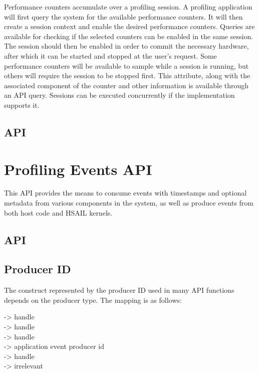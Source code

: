 \documentclass[oneside]{book}
\begin{document}
Performance counters accumulate over a profiling session. A profiling application will first query the system for the available performance counters. It will then create a session context and enable the desired performance counters. Queries are available for checking if the selected counters can be enabled in the same session. The session should then be enabled in order to commit the necessary hardware, after which it can be started and stopped at the user's request. Some performance counters will be available to sample while a session is running, but others will require the session to be stopped first. This attribute, along with the associated component of the counter and other information is available through an API query. Sessions can be executed concurrently if the implementation supports it.

\subsection{API}


\section{Profiling Events API}\label{sec:profevents}
This API provides the means to consume events with timestamps and optional metadata from various components in the system, as well as produce events from both host code and HSAIL kernels.


\subsection{API}


\subsection {Producer ID}
\label{prodid}
The construct represented by the producer ID used in many API functions depends on the producer type. The mapping is as follows:

 ->  handle\\
 ->  handle\\
 ->  handle\\
 -> application event producer id\\
 ->  handle\\
 -> irrelevant\\
\end{document}
